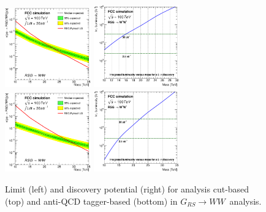 \documentclass{cernrep}
\newcommand*{\rsg}{\ensuremath{G_{RS} \rightarrow WW}}
\begin{document}
\begin{figure}[!htb]\centering
\includegraphics[width=0.33\textwidth]{Fig/RSGww/lim_RSGraviton_ww_fcc_v02_cut.eps}
\includegraphics[width=0.33\textwidth]{Fig/RSGww/DiscoveryPotential_ww_cut_rootStyle.eps}
\includegraphics[width=0.33\textwidth]{Fig/RSGww/lim_RSGraviton_ww_fcc_v02_tagger.eps}
\includegraphics[width=0.33\textwidth]{Fig/RSGww/DiscoveryPotential_ww_tagger_rootStyle.eps}
\caption{Limit (left) and discovery potential (right) for analysis cut-based (top) and anti-QCD tagger-based (bottom) in \rsg\ analysis.}
\label{fig:RSWww_limit}
\end{figure}
\end{document}
